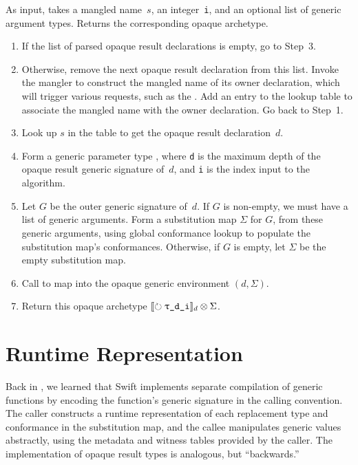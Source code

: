 \documentclass[../generics]{subfiles}
\begin{document}
\begin{algorithm}\label{resolve opaque archetype algorithm}
As input, takes a mangled name~$s$, an integer~\texttt{i}, and an optional list of generic argument types. Returns the corresponding opaque archetype.
\begin{enumerate}
\item If the list of parsed opaque result declarations is empty, go to Step~3.
\item Otherwise, remove the next opaque result declaration from this list. Invoke the mangler to construct the mangled name of its owner declaration, which will trigger various requests, such as the . Add an entry to the lookup table to associate the mangled name with the owner declaration. Go back to Step~1.
\item Look up $s$ in the table to get the opaque result declaration~$d$.
\item Form a generic parameter type , where \texttt{d} is the maximum depth of the opaque result generic signature of~$d$, and \texttt{i} is the index input to the algorithm.
\item Let $G$ be the outer generic signature of~$d$. If $G$ is non-empty, we must have a list of generic arguments. Form a substitution map $\Sigma$ for $G$, from these generic arguments, using global conformance lookup to populate the substitution map's conformances. Otherwise, if $G$ is empty, let $\Sigma$ be the empty substitution map.

\item Call  to map  into the opaque generic environment $(d, \Sigma)$.
\item Return this opaque archetype $\Opaque{\ttgp{d}{i}}_d \otimes \Sigma$.
\end{enumerate}
\end{algorithm}

\section{Runtime Representation}\label{opaque result runtime}

Back in , we learned that Swift implements separate compilation of generic functions by encoding the function's generic signature in the calling convention. The caller constructs a runtime representation of each replacement type and conformance in the substitution map, and the callee manipulates generic values abstractly, using the metadata and witness tables provided by the caller. The implementation of opaque result types is analogous, but ``backwards.''
\end{document}
